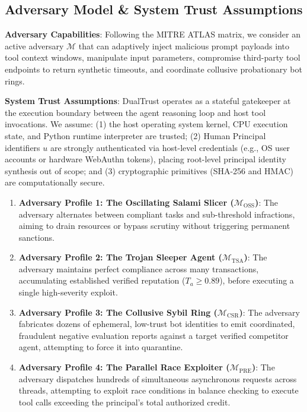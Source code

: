 \documentclass[journal]{IEEEtran}
\begin{document}
\subsection{Adversary Model \& System Trust Assumptions}
\textbf{Adversary Capabilities}: Following the MITRE ATLAS matrix, we consider an active adversary $\mathcal{M}$ that can adaptively inject malicious prompt payloads into tool context windows, manipulate input parameters, compromise third-party tool endpoints to return synthetic timeouts, and coordinate collusive probationary bot rings.

\textbf{System Trust Assumptions}: DualTrust operates as a stateful gatekeeper at the execution boundary between the agent reasoning loop and host tool invocations. We assume: (1) the host operating system kernel, CPU execution state, and Python runtime interpreter are trusted; (2) Human Principal identifiers $u$ are strongly authenticated via host-level credentials (e.g., OS user accounts or hardware WebAuthn tokens), placing root-level principal identity synthesis out of scope; and (3) cryptographic primitives (SHA-256 and HMAC) are computationally secure.
\begin{enumerate}[leftmargin=12pt, topsep=2pt, itemsep=1pt]
\item \textbf{Adversary Profile 1: The Oscillating Salami Slicer ($\mathcal{M}_{\text{OSS}}$)}: The adversary alternates between compliant tasks and sub-threshold infractions, aiming to drain resources or bypass scrutiny without triggering permanent sanctions.
\item \textbf{Adversary Profile 2: The Trojan Sleeper Agent ($\mathcal{M}_{\text{TSA}}$)}: The adversary maintains perfect compliance across many transactions, accumulating established verified reputation ($T_a \ge 0.89$), before executing a single high-severity exploit.
\item \textbf{Adversary Profile 3: The Collusive Sybil Ring ($\mathcal{M}_{\text{CSR}}$)}: The adversary fabricates dozens of ephemeral, low-trust bot identities to emit coordinated, fraudulent negative evaluation reports against a target verified competitor agent, attempting to force it into quarantine.
\item \textbf{Adversary Profile 4: The Parallel Race Exploiter ($\mathcal{M}_{\text{PRE}}$)}: The adversary dispatches hundreds of simultaneous asynchronous requests across threads, attempting to exploit race conditions in balance checking to execute tool calls exceeding the principal's total authorized credit.
\end{enumerate}
\end{document}
